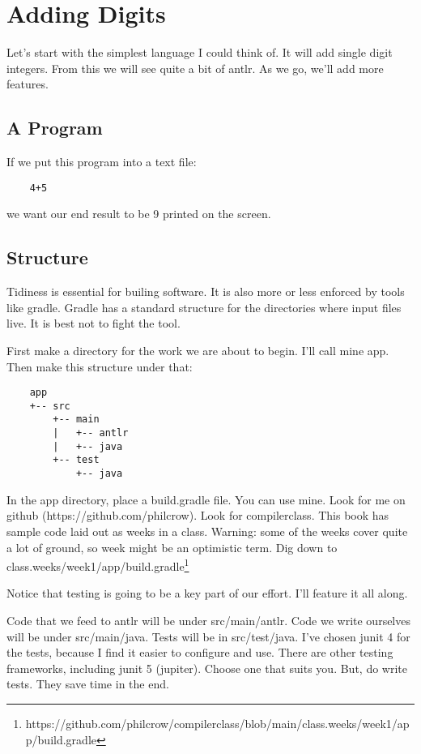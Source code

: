 \chapter{Adding Digits}

Let's start with the simplest language I could think of. It will
add single digit integers. From this we will see quite a bit of
antlr. As we go, we'll add more features.

\section{A Program}

If we put this program into a text file:

{\footnotesize
\begin{verbatim}
    4+5
\end{verbatim}
}

we want our end result to be 9 printed on the screen.

\section{Structure}

Tidiness is essential for builing software. It is also more or less
enforced by tools like gradle. Gradle has a standard structure for
the directories where input files live. It is best not to fight the tool.

First make a directory for the work we are about to begin. I'll call mine
app. Then make this structure under that:

{\footnotesize
\begin{verbatim}
    app
    +-- src
        +-- main
        |   +-- antlr
        |   +-- java
        +-- test
            +-- java
\end{verbatim}
}

In the app directory, place a build.gradle file. You can use mine.
Look for me on github (https://github.com/philcrow). Look for compilerclass.
This book has sample code laid out as weeks in a class.
Warning: some of the weeks cover quite a lot of ground, so week might
be an optimistic term. Dig down to class.weeks/week1/app/build.gradle\footnote{
https://github.com/philcrow/compilerclass/blob/main/class.weeks/week1/app/build.gradle}

Notice that testing is going to be a key part of our effort. I'll feature
it all along.

Code that we feed to antlr will be under src/main/antlr. Code we write
ourselves will be under src/main/java. Tests will be in src/test/java.
I've chosen junit 4 for the tests, because I find it easier to configure
and use. There are other testing frameworks, including junit 5 (jupiter).
Choose one that suits you. But, do write tests. They save time in the end.

